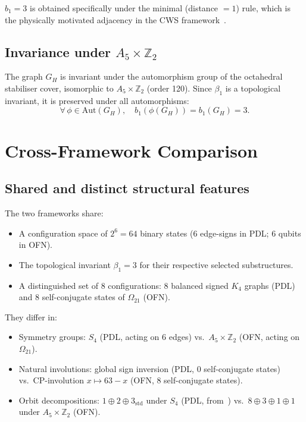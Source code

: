 \documentclass[11pt,a4paper]{article}
\begin{document}
$b_1 = 3$ is obtained specifically under the minimal (distance $= 1$) rule, which is the physically motivated adjacency in the CWS framework~\cite{Evdokimov_CWS_2026}.

\subsection{Invariance under \texorpdfstring{$A_5 \times \mathbb{Z}_2$}{A5 x Z2}}

The graph $G_H$ is invariant under the automorphism group of the octahedral stabiliser cover, isomorphic to $A_5 \times \mathbb{Z}_2$ (order 120). Since $\beta_1$ is a topological invariant, it is preserved under all automorphisms:
\begin{equation}
\forall\, \phi \in \mathrm{Aut}(G_H), \quad b_1(\phi(G_H)) = b_1(G_H) = 3.
\end{equation}

\section{Cross-Framework Comparison}
\label{sec:cross}

\subsection{Shared and distinct structural features}

\begin{result_box}[title={Scripts 2 and 3 --- Orbit and bijection analysis}]
The two frameworks share:
\begin{itemize}
\item A configuration space of $2^6 = 64$ binary states (6 edge-signs in PDL; 6 qubits in OFN).
\item The topological invariant $\beta_1 = 3$ for their respective selected substructures.
\item A distinguished set of 8 configurations: 8 balanced signed $K_4$ graphs (PDL) and 8 self-conjugate states of $\Omega_{21}$ (OFN).
\end{itemize}
They differ in:
\begin{itemize}
\item Symmetry groups: $S_4$ (PDL, acting on 6 edges) vs.\ $A_5 \times \mathbb{Z}_2$ (OFN, acting on $\Omega_{21}$).
\item Natural involutions: global sign inversion (PDL, 0 self-conjugate states) vs.\ CP-involution $x \mapsto 63-x$ (OFN, 8 self-conjugate states).
\item Orbit decompositions: $1 \oplus 2 \oplus 3_{\mathrm{std}}$ under $S_4$ (PDL, from~\cite{Laubscher_D36_2026}) vs.\ $8 \oplus 3 \oplus 1 \oplus 1$ under $A_5 \times \mathbb{Z}_2$ (OFN).
\end{itemize}
\end{result_box}
\end{document}
